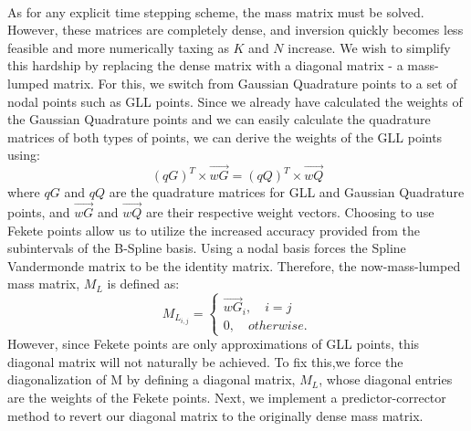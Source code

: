 \documentclass{article}
\begin{document}
\paragraph{}
As for any explicit time stepping scheme, the mass matrix must be solved. However, these matrices are completely dense, and inversion quickly becomes less feasible and more numerically taxing as $K$ and $N$ increase. We wish to simplify this hardship by replacing the dense matrix with a diagonal matrix - a mass-lumped matrix. For this, we switch from Gaussian Quadrature points to a set of nodal points such as GLL points. Since we already have calculated the weights of the Gaussian Quadrature points and we can easily calculate the quadrature matrices of both types of points, we can derive the weights of the GLL points using: 
\begin{equation*}
(qG)^T\times \vec{wG}=(qQ)^T\times \vec{wQ}
\end{equation*}
where $qG$ and $qQ$ are the quadrature matrices for GLL and Gaussian Quadrature points, and $\vec{wG}$ and $\vec{wQ}$ are their respective weight vectors. Choosing to use Fekete points allow us to utilize the increased accuracy provided from the subintervals of the B-Spline basis. Using a nodal basis forces the Spline Vandermonde matrix to be the identity matrix. Therefore, the now-mass-lumped mass matrix, $M_L$ is defined as:
\begin{equation*}
M_{L_{i,j}}=\begin{cases}
\vec{wG}_i,\quad i=j\\ 0,\quad otherwise.
\end{cases}
\end{equation*}
However, since Fekete points are only approximations of GLL points, this diagonal matrix will not naturally be achieved. To fix this,we force the diagonalization of M by defining a diagonal matrix, $M_L$, whose diagonal entries are the weights of the Fekete points. Next, we implement a predictor-corrector method to revert our diagonal matrix to the originally dense mass matrix.
\end{document}
